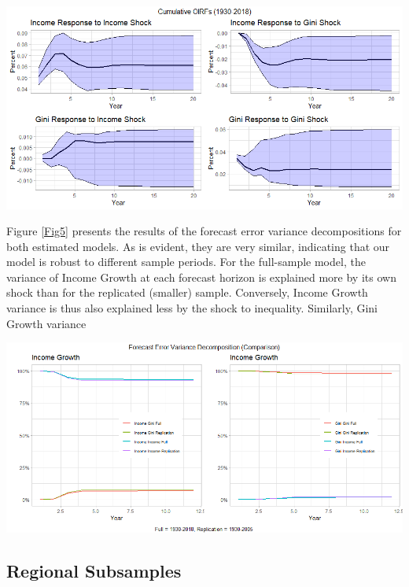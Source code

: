 \documentclass[11pt,preprint, authoryear]{elsarticle}
\let\origfigure\figure
\let\endorigfigure\endfigure
\renewenvironment{figure}[1][2] {
    \expandafter\origfigure\expandafter[H]
} {
    \endorigfigure
}
\numberwithin{equation}{section}
\numberwithin{figure}{section}
\numberwithin{table}{section}
\begin{document}
\begin{figure}[H]

{\centering \includegraphics[width=1\linewidth]{images/Fig4_baseline_full_COIRFs} 

}

\caption{\label{Fig4}}\label{fig:Fig4}
\end{figure}

Figure \ref{Fig5} presents the results of the forecast error variance
decompositions for both estimated models. As is evident, they are very
similar, indicating that our model is robust to different sample
periods. For the full-sample model, the variance of Income Growth at
each forecast horizon is explained more by its own shock than for the
replicated (smaller) sample. Conversely, Income Growth variance is thus
also explained less by the shock to inequality. Similarly, Gini Growth
variance

\begin{figure}[H]
\includegraphics[width=1\linewidth]{images/Fig5_fevd_all} \caption{\label{Fig5}}\label{fig:Fig5}
\end{figure}

\newpage

\hypertarget{regional-subsamples}{%
\subsection{\texorpdfstring{Regional Subsamples
\label{Section 3.4}}{Regional Subsamples }}\label{regional-subsamples}}
\end{document}
